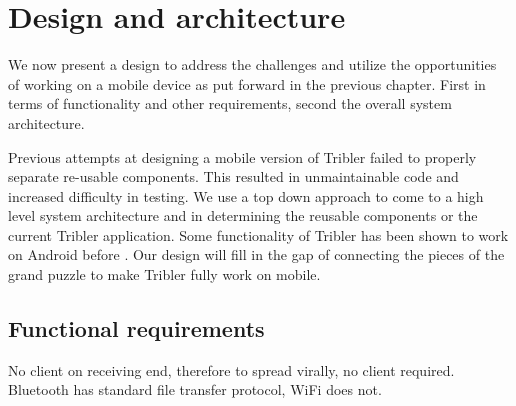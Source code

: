 \chapter{Design and architecture}
\label{ch:design}

We now present a design to address the challenges and utilize the opportunities of working on a mobile device as put forward in the previous chapter.
First in terms of functionality and other requirements, second the overall system architecture.

Previous attempts at designing a mobile version of Tribler failed to properly separate re-usable components.
This resulted in unmaintainable code and increased difficulty in testing.
We use a top down approach to come to a high level system architecture and in determining the reusable components or the current Tribler application.
Some functionality of Tribler has been shown to work on Android before \cite{bsc1,2,3}.
Our design will fill in the gap of connecting the pieces of the grand puzzle to make Tribler fully work on mobile.


\section{Functional requirements}\label{sec:func_req}


No client on receiving end, therefore to spread virally, no client required.
Bluetooth has standard file transfer protocol, WiFi does not.

